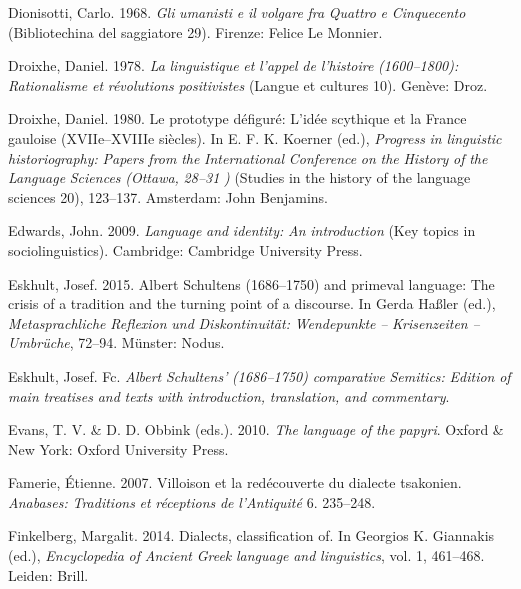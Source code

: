 Dionisotti, Carlo. 1968. \textit{Gli} \textit{umanisti} \textit{e} \textit{il} \textit{volgare} \textit{fra} \textit{Quattro} \textit{e} \textit{Cinquecento} (Bibliotechina del saggiatore 29). Firenze: Felice Le Monnier.

Droixhe, Daniel. 1978. \textit{La} \textit{linguistique} \textit{et} \textit{l’appel} \textit{de} \textit{l’histoire} \textit{(1600–1800):} \textit{Rationalisme} \textit{et} \textit{révolutions} \textit{positivistes} (Langue et cultures 10). Genève: Droz.

Droixhe, Daniel. 1980. Le prototype défiguré: L’idée scythique et la France gauloise (XVIIe–XVIIIe siècles). In E. F. K. Koerner (ed.), \textit{Progress} \textit{in} \textit{linguistic} \textit{historiography:} \textit{Papers} \textit{from} \textit{the} \textit{International} \textit{Conference} \textit{on} \textit{the} \textit{History} \textit{of} \textit{the} \textit{Language} \textit{Sciences} \textit{(Ottawa,} \textit{28–31} \textit{\citealt{August1978})} (Studies in the history of the language sciences 20), 123–137. Amsterdam: John Benjamins.

Edwards, John. 2009. \textit{Language} \textit{and} \textit{identity:} \textit{An} \textit{introduction} (Key topics in sociolinguistics). Cambridge: Cambridge University Press.

Eskhult, Josef. 2015. Albert Schultens (1686–1750) and primeval language: The crisis of a tradition and the turning point of a discourse. In Gerda Haßler (ed.), \textit{Metasprachliche} \textit{Reflexion} \textit{und} \textit{Diskontinuität:} \textit{Wendepunkte} \textit{–} \textit{Krisenzeiten} \textit{–} \textit{Umbrüche}, 72–94. Münster: Nodus.

Eskhult, Josef. Fc. \textit{Albert} \textit{Schultens’} \textit{(1686–1750)} \textit{comparative} \textit{Semitics:} \textit{Edition} \textit{of} \textit{main} \textit{treatises} \textit{and} \textit{texts} \textit{with} \textit{introduction,} \textit{translation,} \textit{and} \textit{commentary}.

Evans, T. V. \& D. D. Obbink (eds.). 2010. \textit{The} \textit{language} \textit{of} \textit{the} \textit{papyri}. Oxford \& New York: Oxford University Press.

Famerie, Étienne. 2007. Villoison et la redécouverte du dialecte tsakonien. \textit{Anabases:} \textit{Traditions} \textit{et} \textit{réceptions} \textit{de} \textit{l’Antiquité} 6. 235–248.

Finkelberg, Margalit. 2014. Dialects, classification of. In Georgios K. Giannakis (ed.), \textit{Encyclopedia} \textit{of} \textit{Ancient} \textit{Greek} \textit{language} \textit{and} \textit{linguistics}, vol. 1, 461–468. Leiden: Brill.

